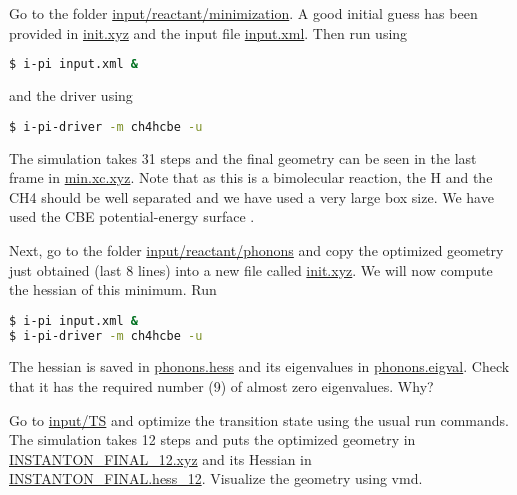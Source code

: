 \documentclass{article}
\begin{document}
\begin{Exercise}[label={reactant},title={Optimizing and analysing the reactant}]

\Question
Go to the folder \url{input/reactant/minimization}.
A good initial guess has been provided in \url{init.xyz} and the input file \url{input.xml}.
Then run \ipi{} using
\begin{lstlisting}[language=bash]
$ i-pi input.xml &
\end{lstlisting}
and the driver using
\begin{lstlisting}[language=bash]
$ i-pi-driver -m ch4hcbe -u
\end{lstlisting}

The simulation takes 31 steps and the final geometry can be seen in the last frame in \url{min.xc.xyz}.
Note that as this is a bimolecular reaction, the H and the CH4 should be well separated and we have used a very large box size.
We have used the CBE potential-energy surface \cite{Corchado2009HCH4}.

\Question
Next, go to the folder \url{input/reactant/phonons} and copy the optimized geometry just obtained (last 8 lines) into a new file called \url{init.xyz}.
We will now compute the hessian of this minimum.
Run
\begin{lstlisting}[language=bash]
$ i-pi input.xml &
$ i-pi-driver -m ch4hcbe -u
\end{lstlisting}

The hessian is saved in \url{phonons.hess} and its eigenvalues in \url{phonons.eigval}.  Check that it has the required number (9) of almost zero eigenvalues.  Why?

\end{Exercise}

\begin{Exercise}[label={TS},title={Optimizing and analysing the transition state}]

Go to \url{input/TS} and optimize the transition state using the usual run commands.
The simulation takes 12 steps and puts the optimized geometry in \url{INSTANTON_FINAL_12.xyz}
and its Hessian in \url{INSTANTON_FINAL.hess_12}.
Visualize the geometry using vmd.

\end{Exercise}
\end{document}
